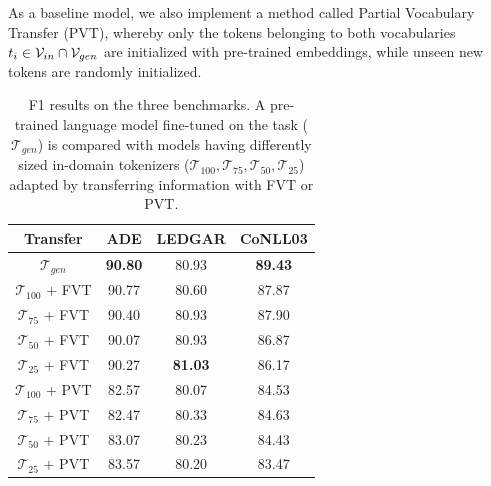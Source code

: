 \documentclass[11pt]{article}
\def\tok{\mathcal{T}}
\def\tokgen{\mathcal{T}_{gen}}
\begin{document}


As a baseline model, we also implement a method called Partial Vocabulary Transfer (PVT), whereby only the tokens belonging to both vocabularies $t_i \in {\cal V}_{in} \cap  {\cal V}_{gen}$ are initialized with pre-trained embeddings, while unseen new tokens are randomly initialized.

\begin{table}[ht]
    \begin{tabular}{cccc}
        \hline
        
        \textbf{Transfer} & \textbf{ADE} & \textbf{LEDGAR} & \textbf{CoNLL03}\\ \hline
        
        $\tokgen$ & \textbf{90.80} & 80.93 & \textbf{89.43}\\ \hline
        
        $\tok_{100}$ + FVT & 90.77 & 80.60          & 87.87\\
        $\tok_{75}$  + FVT & 90.40 & 80.93          & 87.90\\
        $\tok_{50}$  + FVT & 90.07 & 80.93          & 86.87\\
        $\tok_{25}$  + FVT & 90.27 & \textbf{81.03} & 86.17\\ \hline
        
        $\tok_{100}$ + PVT & 82.57 & 80.07 & 84.53\\
        $\tok_{75}$  + PVT & 82.47 & 80.33 & 84.63\\
        $\tok_{50}$  + PVT & 83.07 & 80.23 & 84.43\\
        $\tok_{25}$  + PVT & 83.57 & 80.20 & 83.47\\ 
        
        \hline             
    \end{tabular} \caption{F1 results on the three benchmarks. A pre-trained language model fine-tuned on the task ($\tokgen$) is compared with models having differently sized in-domain tokenizers ($\tok_{100},\tok_{75},\tok_{50},\tok_{25}$) adapted by transferring information with FVT or PVT.}\label{tab:base_f1_results}
\end{table}
\end{document}
